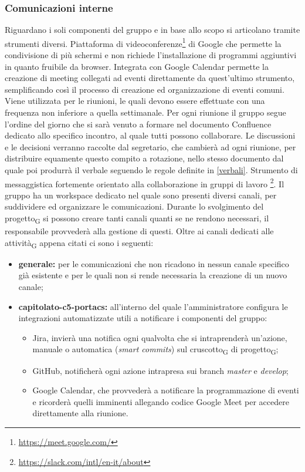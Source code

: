     \subsubsection{Comunicazioni interne}
        Riguardano i soli componenti del gruppo \group e in base allo scopo si articolano tramite strumenti diversi.
            Piattaforma di videoconferenze\footnote{\url{https://meet.google.com/}} di Google che permette la condivisione di più schermi e non richiede l'installazione di programmi aggiuntivi in quanto fruibile da browser. Integrata con Google Calendar permette la creazione di meeting collegati ad eventi direttamente da quest'ultimo strumento, semplificando così il processo di creazione ed organizzazione di eventi comuni.
            Viene utilizzata per le riunioni, le quali devono essere effettuate con una frequenza non inferiore a quella settimanale. Per ogni riunione il gruppo segue l'ordine del giorno che si sarà venuto a formare nel documento Confluence dedicato allo specifico incontro, al quale tutti possono collaborare. Le discussioni e le decisioni verranno raccolte dal segretario, che cambierà ad ogni riunione, per distribuire equamente questo compito a rotazione, nello stesso documento dal quale poi produrrà il verbale seguendo le regole definite in \ref{verbali}.
            Strumento di messaggistica fortemente orientato alla collaborazione in gruppi di lavoro \footnote{\url{https://slack.com/intl/en-it/about}}. Il gruppo \group ha un workspace dedicato nel quale sono presenti diversi canali, per suddividere ed organizzare le comunicazioni. Durante lo svolgimento del progetto\textsubscript{G} si possono creare tanti canali quanti se ne rendono necessari, il responsabile provvederà alla gestione di questi. Oltre ai canali dedicati alle attività\textsubscript{G} appena citati ci sono i seguenti:
            \begin{itemize}
                \item \textbf{generale: }per le comunicazioni che non ricadono in nessun canale specifico già esistente e per le quali non si rende necessaria la creazione di un nuovo canale;
                \item \textbf{capitolato-c5-portacs: }all'interno del quale l'amministratore configura le integrazioni automatizzate utili a notificare i componenti del gruppo:
                \begin{itemize}
                    \item Jira, invierà una notifica ogni qualvolta che si intraprenderà un'azione, manuale o automatica (\textit{smart commits}) sul cruscotto\textsubscript{G} di progetto\textsubscript{G};
                    \item GitHub, notificherà ogni azione intrapresa sui branch \textit{master} e \textit{develop};
                    \item Google Calendar, che provvederà a notificare la programmazione di eventi e ricorderà quelli imminenti allegando codice Google Meet per accedere direttamente alla riunione.
                \end{itemize}
            \end{itemize}
